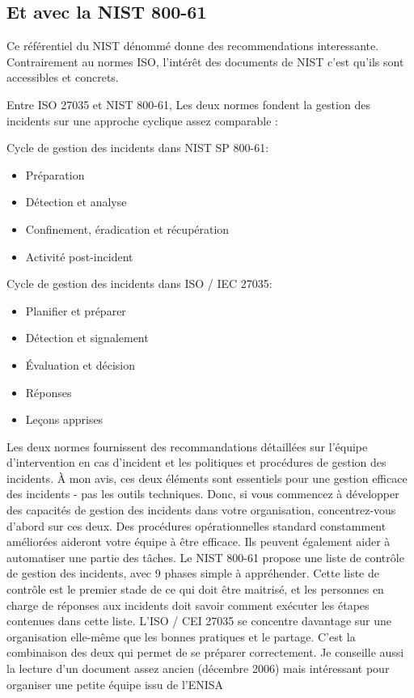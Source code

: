 \subsection{Et avec la NIST 800-61}


Ce référentiel du NIST dénommé  donne des recommendations interessante. Contrairement au normes ISO, l'intérêt des documents de NIST c'est qu'ils sont accessibles et concrets. 

Entre ISO 27035 et NIST 800-61, Les deux normes fondent la gestion des incidents sur une approche cyclique assez comparable : 

Cycle de gestion des incidents dans NIST SP 800-61:

\begin{itemize}
  \item Préparation
  \item Détection et analyse
  \item Confinement, éradication et récupération
  \item Activité post-incident
\end{itemize}

Cycle de gestion des incidents dans ISO / IEC 27035:

\begin{itemize}
  \item Planifier et préparer
  \item Détection et signalement
  \item Évaluation et décision
  \item Réponses
  \item Leçons apprises
\end{itemize}

Les deux normes fournissent des recommandations détaillées sur l'équipe d'intervention en cas d'incident et les politiques et procédures de gestion des incidents. À mon avis, ces deux éléments sont essentiels pour une gestion efficace des incidents - pas les outils techniques. Donc, si vous commencez à développer des capacités de gestion des incidents dans votre organisation, concentrez-vous d'abord sur ces deux. Des procédures opérationnelles standard constamment améliorées aideront votre équipe à être efficace. Ils peuvent également aider à automatiser une partie des tâches.
Le NIST 800-61 propose une liste de contrôle de gestion des incidents, avec 9 phases simple à appréhender. Cette liste de contrôle est le premier stade de ce qui doit être maitrisé, et les personnes en charge de réponses aux incidents doit savoir comment exécuter les étapes contenues dans cette liste.
L'ISO / CEI 27035  se concentre davantage sur une organisation elle-même que les bonnes pratiques et le partage. 
C'est la combinaison des deux qui permet de se préparer correctement.
Je conseille aussi la lecture d'un document assez ancien (décembre 2006) mais intéressant pour organiser une petite équipe issu de l'ENISA 

